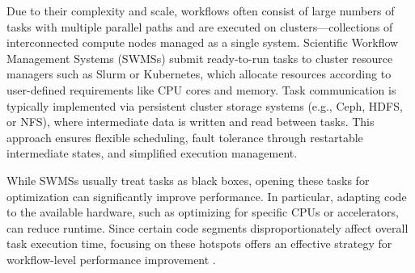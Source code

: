 Due to their complexity and scale, workflows often consist of large numbers of tasks with multiple parallel paths and are executed on clusters—collections of interconnected compute nodes managed as a single system. Scientific Workflow Management Systems (SWMSs) submit ready-to-run tasks to cluster resource managers such as Slurm or Kubernetes, which allocate resources according to user-defined requirements like CPU cores and memory. Task communication is typically implemented via persistent cluster storage systems (e.g., Ceph, HDFS, or NFS), where intermediate data is written and read between tasks. This approach ensures flexible scheduling, fault tolerance through restartable intermediate states, and simplified execution management.

While SWMSs usually treat tasks as black boxes, opening these tasks for optimization can significantly improve performance. In particular, adapting code to the available hardware, such as optimizing for specific CPUs or accelerators, can reduce runtime. Since certain code segments disproportionately affect overall task execution time, focusing on these hotspots offers an effective strategy for workflow-level performance improvement \cite{thamsen2025energyawareworkflowexecutionoverview}.


